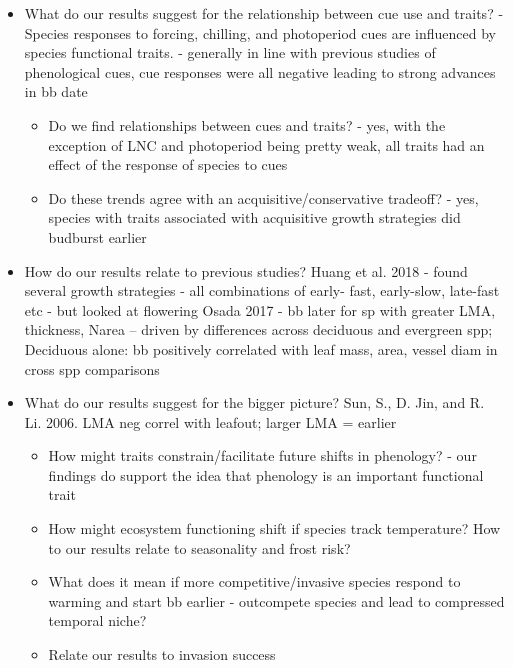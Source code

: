 \documentclass{article}\usepackage[]{graphicx}\usepackage[]{color}
\begin{document}
\begin{itemize}
\item What do our results suggest for the relationship between cue use and traits? 
- Species responses to forcing, chilling, and photoperiod cues are influenced by species functional traits. 
- generally in line with previous studies of phenological cues, cue responses were all negative leading to strong advances in bb date 
	\begin{itemize}
	\item Do we find relationships between cues and traits?
	- yes, with the exception of LNC and photoperiod being pretty weak, all traits had an effect of the response of species to cues
	\item Do these trends agree with an acquisitive/conservative tradeoff?
	- yes, species with traits associated with acquisitive growth strategies did budburst earlier
	\end{itemize}
\item How do our results relate to previous studies? 
        Huang et al. 2018 - found several growth strategies - all combinations of early- fast, early-slow, late-fast etc - but looked at flowering
        Osada 2017 - bb later for sp with greater LMA, thickness, Narea – driven by differences across deciduous and evergreen spp; 	Deciduous alone: bb positively correlated with leaf mass, area, vessel diam in cross spp comparisons
\item What do our results suggest for the bigger picture?
Sun, S., D. Jin, and R. Li. 2006. LMA neg correl with leafout; larger LMA = earlier
	\begin{itemize}
	\item How might traits constrain/facilitate future shifts in phenology?
	- our findings do support the idea that phenology is an important functional trait
	\item How might ecosystem functioning shift if species track temperature? How to our results relate to seasonality and frost risk?
	\item What does it mean if more competitive/invasive species respond to warming and start bb earlier - outcompete species and lead to compressed temporal niche?
	\item Relate our results to invasion success 
	\end{itemize}


\end{itemize}
\end{document}
